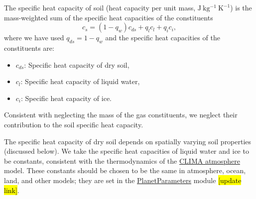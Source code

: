 \documentclass[twoside,10pt]{report}
\begin{document}
The specific heat capacity of soil (heat capacity per unit mass, $\mathrm{J~kg^{-1}~K^{-1}}$) is the mass-weighted sum of the specific heat capacities of the constituents
\begin{equation}\label{e:soil_specific_heat}
    c_s = (1-q_w) c_{ds} + q_l c_{l} + q_i c_{i},
\end{equation}
where we have used $q_{ds} = 1 - q_w$ and the specific heat capacities of the constituents are:
\begin{itemize}
    \item $c_{ds}$: Specific heat capacity of dry soil,
    \item $c_l$: Specific heat capacity of liquid water,
    \item $c_i$: Specific heat capacity of ice.
\end{itemize}
Consistent with neglecting the mass of the gas constituents, we neglect their contribution to the soil specific heat capacity.

The specific heat capacity of dry soil depends on spatially varying soil properties (discussed below). We take the specific heat capacities of liquid water and ice to be constants, consistent with the thermodynamics of the  \href{https://github.com/climate-machine/Design-Docs/blob/master/CLIMA-atmos/}{CLIMA atmosphere} model. These constants should be chosen to be the same in atmosphere, ocean, land, and other models; they are set in the \href{https://github.com/climate-machine/CLIMA/tree/master/src/Common/PlanetParameters}{PlanetParameters} module \hl{[update link]}.
\end{document}
